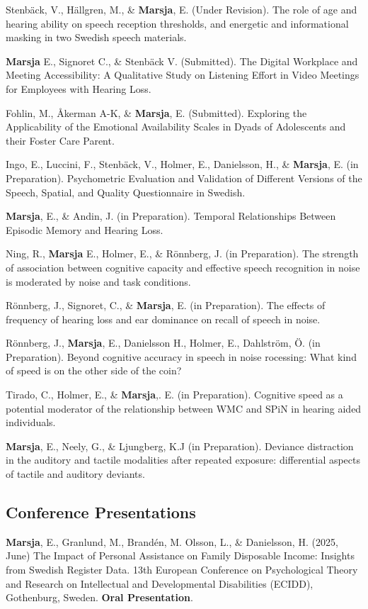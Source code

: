 \documentclass[]{article}
\begin{document}
Stenbäck, V., Hällgren, M., \& \textbf{Marsja}, E. (Under Revision). The
role of age and hearing ability on speech reception thresholds, and
energetic and informational masking in two Swedish speech materials.

\textbf{Marsja} E., Signoret C., \& Stenbäck V. (Submitted). The Digital
Workplace and Meeting Accessibility: A Qualitative Study on Listening
Effort in Video Meetings for Employees with Hearing Loss.

Fohlin, M., Åkerman A-K, \& \textbf{Marsja}, E. (Submitted). Exploring
the Applicability of the Emotional Availability Scales in Dyads of
Adolescents and their Foster Care Parent.

Ingo, E., Luccini, F., Stenbäck, V., Holmer, E., Danielsson, H., \&
\textbf{Marsja}, E. (in Preparation). Psychometric Evaluation and
Validation of Different Versions of the Speech, Spatial, and Quality
Questionnaire in Swedish.

\textbf{Marsja}, E., \& Andin, J. (in Preparation). Temporal
Relationships Between Episodic Memory and Hearing Loss.

Ning, R., \textbf{Marsja} E., Holmer, E., \& Rönnberg, J. (in
Preparation). The strength of association between cognitive capacity and
effective speech recognition in noise is moderated by noise and task
conditions.

Rönnberg, J., Signoret, C., \& \textbf{Marsja}, E. (in Preparation). The
effects of frequency of hearing loss and ear dominance on recall of
speech in noise.

Rönnberg, J., \textbf{Marsja}, E., Danielsson H., Holmer, E., Dahlström,
Ö. (in Preparation). Beyond cognitive accuracy in speech in noise
rocessing: What kind of speed is on the other side of the coin?

Tirado, C., Holmer, E., \& \textbf{Marsja},. E. (in Preparation).
Cognitive speed as a potential moderator of the relationship between WMC
and SPiN in hearing aided individuals.

\textbf{Marsja}, E., Neely, G., \& Ljungberg, K.J (in Preparation).
Deviance distraction in the auditory and tactile modalities after
repeated exposure: differential aspects of tactile and auditory
deviants.

\subsection{Conference Presentations}\label{conference-presentations}

\textbf{Marsja}, E., Granlund, M., Brandén, M. Olsson, L., \&
Danielsson, H. (2025, June) The Impact of Personal Assistance on Family
Disposable Income: Insights from Swedish Register Data. 13th European
Conference on Psychological Theory and Research on Intellectual and
Developmental Disabilities (ECIDD), Gothenburg, Sweden. \textbf{Oral
Presentation}.
\end{document}
